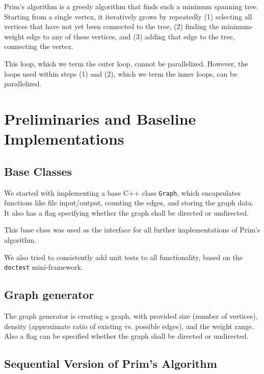 \documentclass[sigconf,nonacm]{acmart}
\begin{document}
Prim’s algorithm \cite{prim1957} is a greedy algorithm that finds such a minimum spanning tree. Starting from a single vertex, it iteratively grows by repeatedly (1) selecting all vertices that have not yet been connected to the tree, (2) finding the minimum-weight edge to any of these vertices, and (3) adding that edge to the tree, connecting the vertex.

This loop, which we term the outer loop, cannot be parallelized. However, the loops used within steps (1) and (2), which we term the inner loops, can be parallelized.

\section{Preliminaries and Baseline Implementations}


\subsection{Base Classes}

We started with implementing a base C++ class \texttt{Graph},
which encapsulates functions like file input/output, counting the edges,
and storing the graph data.
It also has a flag specifying whether the graph shall be directed or
undirected.

This base class was used as the interface for all further implementations
of Prim's algorithm.

We also tried to consistently add unit tests to all functionality,
based on the \texttt{doctest} mini-framework.

\subsection{Graph generator}

The graph generator is creating a graph, with provided size (number of vertices),
density (approximate ratio of existing vs. possible edges), and the weight range.
Also a flag can be specified whether the graph shall be directed or undirected.

\subsection{Sequential Version of Prim's Algorithm}
\end{document}
